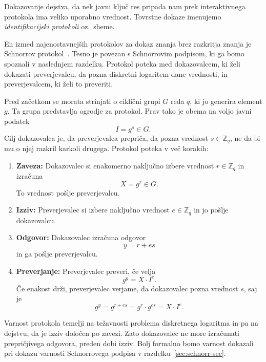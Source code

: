 \documentclass[isrm2, tisk]{fmfdelo}
\newcommand{\Z}{\mathbb Z}
\begin{document}
Dokazovanje dejstva, da nek javni ključ res pripada nam prek interaktivnega protokola ima veliko
uporabno vrednost. Tovrstne dokaze imenujemo \textit{identifikacijski protokoli} oz.\ sheme.

\begin{primer}
    En izmed najenostavnejših protokolov za dokaz znanja brez razkritja znanja je Schnorrov
    protokol~\cite{schnorr1989sig}. Tesno je povezan s Schnorrovim podpisom, ki ga bomo spoznali v
    naslednjem razdelku. Protokol poteka med dokazovalcem, ki želi dokazati preverjevalcu, da
    pozna diskretni logaritem dane vrednosti, in preverjevalcem, ki želi to preveriti.

    Pred začetkom se morata strinjati o ciklični grupi $G$ reda $q$, ki jo generira element $g$. Ta
    grupa predstavlja ogrodje za protokol. Prav tako je obema na voljo javni podatek
    $$
    I = g^s \in G.
    $$
    Cilj dokazovalca je, da preverjevalca prepriča, da pozna vrednost $s \in \Z_q$, ne da bi mu
    o njej razkril karkoli drugega. Protokol poteka v več korakih:
    \begin{enumerate}
        \item \textbf{Zaveza:}
            Dokazovalec si enakomerno naključno izbere vrednost $r \in \Z_q$ in izračuna
            $$
            X = g^r \in G.
            $$
            To vrednost pošlje preverjevalcu.
        \item \textbf{Izziv:}
            Preverjevalec si izbere naključno vrednost $e \in \Z_q$ in jo pošlje dokazovalcu.
        \item \textbf{Odgovor:}
            Dokazovalec izračuna odgovor
            $$
            y = r + es
            $$
            in ga pošlje preverjevalcu.
        \item \textbf{Preverjanje:}
            Preverjevalec preveri, če velja
            $$
            g^y = X \cdot I^e.
            $$
            Če enakost drži, preverjevalec verjame, da dokazovalec pozna vrednost $s$, saj je
            $$
            g^y = g^{r + es} = g^r \cdot g^{es} = X \cdot I^e.
            $$
    \end{enumerate}
    Varnost protokola temelji na težavnosti problema diskretnega logaritma in pa na dejstvu, da je
    izziv določen po zavezi. Zato dokazovalec ne more izračunati prepričjivega odgovora, preden
    dobi izziv. Bolj formalno bomo varnost dokazali pri dokazu varnosti Schnorrovega podpisa v
    razdelku~\ref{sec:schnorr-sec}.
\end{primer}
\end{document}
